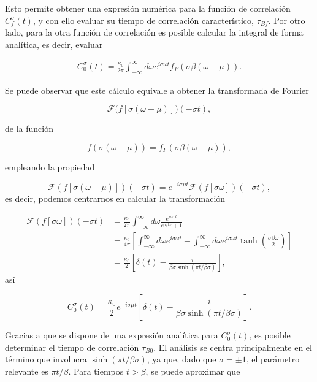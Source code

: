 \begin{appendixs}
Esto permite obtener una expresión numérica para la función de correlación $C^{\sigma}_{f}(t)$, y con ello evaluar su tiempo de correlación característico, $\tau_{Bf}$. Por otro lado, para la otra función de correlación es posible calcular la integral de forma analítica, es decir, evaluar

\begin{align*}
       C_{0}^{\sigma}(t) = \frac{\kappa_{0}}{2\pi} \int_{-\infty}^{\infty} d\omega e^{i\sigma \omega t }f_{F}(\sigma \beta (\omega -  \mu)).
\end{align*}    

Se puede  observar que este cálculo equivale a obtener la transformada de Fourier 

\[
\mathcal{F}\big(f[\sigma (\omega - \mu)]\big)(-\sigma t),
\]

de la función 

\[
f(\sigma(\omega-\mu)) = f_{F}(\sigma \beta (\omega-\mu)),
\]

empleando la propiedad

\begin{equation*}
\mathcal{F}(f[\sigma (\omega - \mu)])(-\sigma t) = e^{-i \sigma \mu t}\mathcal{F}(f[\sigma \omega])(-\sigma t),
\end{equation*}
es decir, podemos centrarnos en calcular la transformación

\begin{align*}
    \mathcal{F}(f[\sigma \omega])(-\sigma t) &= \frac{\kappa_{0}}{2\pi} \int_{-\infty}^{\infty} d\omega \frac{e^{i\sigma \omega t}}{e^{\sigma \beta \omega} +1 } \\
        & = \frac{\kappa_{0}}{4\pi} \left[\int_{-\infty}^{\infty}d \omega e^{i\sigma \omega t} - \int_{-\infty}^{\infty}d\omega e^{i\sigma \omega t} \tanh \left(\frac{ \sigma \beta \omega }{2} \right)   \right] \\
        & =  \frac{\kappa_{0}}{2} \left[\delta(t) - \frac{i}{\beta \sigma \sinh(\pi t/\beta \sigma)} \right],
\end{align*}
así

\begin{equation*}
    C^{\sigma}_{0}(t) = \frac{\kappa_{0}}{2}e^{-i\sigma \mu t} \left[\delta(t) - \frac{i}{\beta \sigma \sinh(\pi t/\beta \sigma)} \right].
\end{equation*}

Gracias a que se dispone de una expresión analítica para $C^{\sigma}_{0}(t)$, es posible determinar el tiempo de correlación $\tau_{B0}$. El análisis se centra principalmente en el término que involucra $\sinh(\pi t/\beta \sigma)$, ya que, dado que $\sigma = \pm 1$, el parámetro relevante es $\pi t/\beta$. Para tiempos $t > \beta$, se puede aproximar que 


\end{appendixs}
